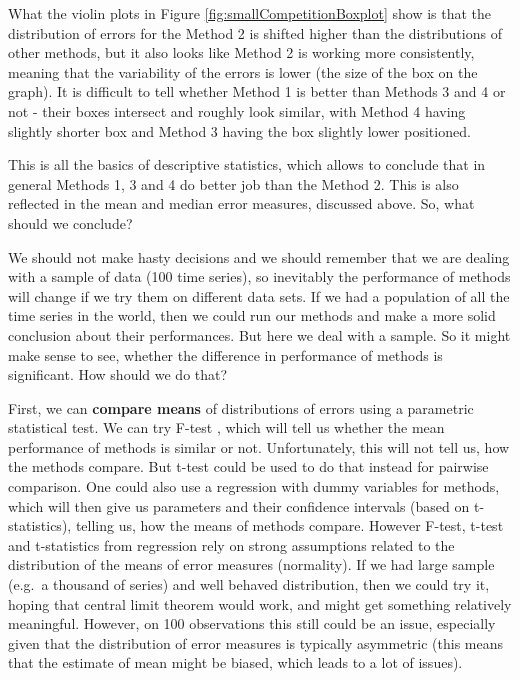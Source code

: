 \documentclass[
]{book}
\theoremstyle{definition}
\theoremstyle{definition}
\theoremstyle{definition}
\theoremstyle{definition}
\theoremstyle{remark}
\begin{document}
What the violin plots in Figure \ref{fig:smallCompetitionBoxplot} show is that the distribution of errors for the Method 2 is shifted higher than the distributions of other methods, but it also looks like Method 2 is working more consistently, meaning that the variability of the errors is lower (the size of the box on the graph). It is difficult to tell whether Method 1 is better than Methods 3 and 4 or not - their boxes intersect and roughly look similar, with Method 4 having slightly shorter box and Method 3 having the box slightly lower positioned.

This is all the basics of descriptive statistics, which allows to conclude that in general Methods 1, 3 and 4 do better job than the Method 2. This is also reflected in the mean and median error measures, discussed above. So, what should we conclude?

We should not make hasty decisions and we should remember that we are dealing with a sample of data (100 time series), so inevitably the performance of methods will change if we try them on different data sets. If we had a population of all the time series in the world, then we could run our methods and make a more solid conclusion about their performances. But here we deal with a sample. So it might make sense to see, whether the difference in performance of methods is significant. How should we do that?

First, we can \textbf{compare means} of distributions of errors using a parametric statistical test. We can try F-test \citep{WikipediaFTest}, which will tell us whether the mean performance of methods is similar or not. Unfortunately, this will not tell us, how the methods compare. But t-test \citep{WikipediaTTest} could be used to do that instead for pairwise comparison. One could also use a regression with dummy variables for methods, which will then give us parameters and their confidence intervals (based on t-statistics), telling us, how the means of methods compare. However F-test, t-test and t-statistics from regression rely on strong assumptions related to the distribution of the means of error measures (normality). If we had large sample (e.g.~a thousand of series) and well behaved distribution, then we could try it, hoping that central limit theorem would work, and might get something relatively meaningful. However, on 100 observations this still could be an issue, especially given that the distribution of error measures is typically asymmetric (this means that the estimate of mean might be biased, which leads to a lot of issues).
\end{document}
